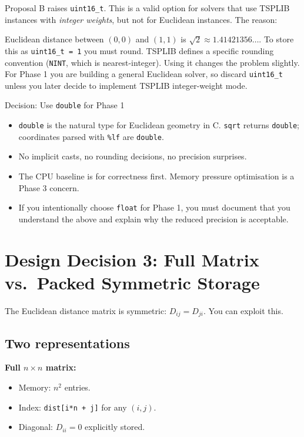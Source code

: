 \documentclass[11pt]{article}
\begin{document}
Proposal B raises \texttt{uint16\_t}. This is a valid option for solvers that use TSPLIB instances with \emph{integer weights}, but not for Euclidean instances. The reason:

Euclidean distance between $(0,0)$ and $(1,1)$ is $\sqrt{2} \approx 1.41421356\ldots$. To store this as \texttt{uint16\_t = 1} you must round. TSPLIB defines a specific rounding convention (\texttt{NINT}, which is nearest-integer). Using it changes the problem slightly. For Phase 1 you are building a general Euclidean solver, so discard \texttt{uint16\_t} unless you later decide to implement TSPLIB integer-weight mode.

\begin{goodbox}{Decision: Use \texttt{double} for Phase 1}
\begin{itemize}
  \item \texttt{double} is the natural type for Euclidean geometry in C. \texttt{sqrt} returns \texttt{double}; coordinates parsed with \texttt{\%lf} are \texttt{double}.
  \item No implicit casts, no rounding decisions, no precision surprises.
  \item The CPU baseline is for correctness first. Memory pressure optimisation is a Phase 3 concern.
  \item If you intentionally choose \texttt{float} for Phase 1, you must document that you understand the above and explain why the reduced precision is acceptable.
\end{itemize}
\end{goodbox}

\newpage

\section{Design Decision 3: Full Matrix vs.\ Packed Symmetric Storage}

The Euclidean distance matrix is symmetric: $D_{ij} = D_{ji}$. You can exploit this.

\subsection{Two representations}

\textbf{Full $n \times n$ matrix:}
\begin{itemize}
  \item Memory: $n^2$ entries.
  \item Index: \texttt{dist[i*n + j]} for any $(i, j)$.
  \item Diagonal: $D_{ii} = 0$ explicitly stored.
\end{itemize}
\end{document}
